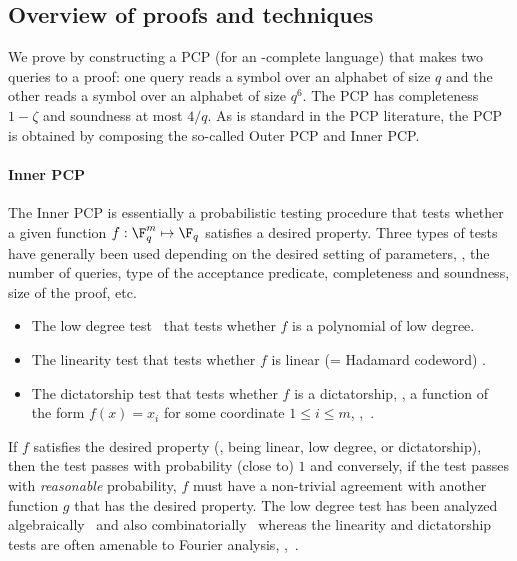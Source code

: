\subsection{Overview of proofs and techniques}

We prove  by constructing a PCP (for an -complete language)
that makes two queries to a proof: one query reads a symbol over an alphabet of
size $q$ and the other reads a symbol
over an alphabet of size $q^6$. The PCP has completeness $1-\zeta$
and soundness at most ${4}/{q}$.
As is standard in the PCP literature, the PCP is obtained by composing the so-called
Outer PCP and Inner PCP.

\paragraph{Inner PCP}
The Inner PCP is essentially a probabilistic
testing procedure that tests whether a given function $f: \F_q^m \mapsto \F_q$
satisfies a desired property. Three types of tests have generally been used depending
on the desired setting of parameters, \eg, the number of queries, type of the
acceptance predicate,
completeness and soundness, size of the proof, etc.
\begin{itemize}
\item The low degree test~\cite{FGLSS, AS, AroraSudan, RazSafra} that tests whether $f$ is a polynomial of low degree.
\item The linearity test that tests whether $f$ is linear (= Hadamard codeword) \cite{ALMSS, Kh-maxclique}.
\item The dictatorship test that tests whether $f$ is a dictatorship, \ie, a function
of the form $f(x)=x_i$ for some coordinate $1 \leq i \leq m$, \eg,~\cite{BGS, Has96, Has97}.
\end{itemize}
If $f$ satisfies the desired property (\ie, being linear, low degree, or dictatorship),
then the test passes with probability
(close to) $1$ and conversely, if the test passes with \emph{reasonable} probability,
$f$ must have a non-trivial agreement with another function $g$ that has the desired property.
The low degree test has been analyzed algebraically~\cite{FGLSS, AS, AroraSudan}
and also combinatorially~\cite{RazSafra}
whereas the linearity and dictatorship tests are often amenable to
Fourier analysis, \eg,~\cite{Kh-maxclique, Has96, Has97, KKMO}.

